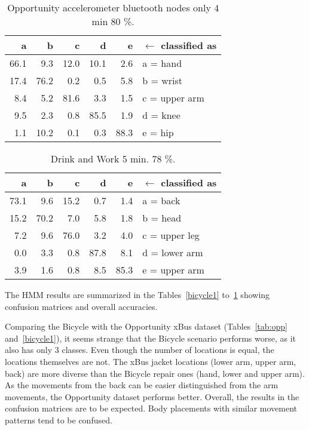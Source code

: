 \begin{table}[!t]
\centering
\caption[Opportunity accelerometer bluetooth nodes]{Opportunity accelerometer bluetooth nodes only 4 min 80 \%.}
\begin{tabular}{|r r r r r ||l|}\midrule
a &b &c &d &e &$\gets$ classified as\\\midrule
66.1 &9.3 &12.0 &10.1 &2.6 &a = hand\\
17.4 &76.2 &0.2 &0.5 &5.8 &b = wrist\\
8.4 &5.2 &81.6 &3.3 &1.5 &c = upper arm\\
9.5 &2.3 &0.8 &85.5 &1.9 &d = knee\\
1.1 &10.2 &0.1 &0.3 &88.3 &e = hip\\
\bottomrule
\end{tabular}
\end{table}


\begin{table}[!t]
\centering
\caption{Drink and Work 5 min. 78 \%.}
\begin{tabular}{|r r r r r l|}\midrule
a &b &c &d &e &$\gets$ classified as\\\midrule
73.1 &9.6 &15.2 &0.7 &1.4 &a = back\\
15.2 &70.2 &7.0 &5.8 &1.8 &b = head\\
7.2 &9.6 &76.0 &3.2 &4.0 &c = upper leg\\
0.0 &3.3 &0.8 &87.8 &8.1 &d = lower arm\\
3.9 &1.6 &0.8 &8.5 &85.3 &e = upper arm\\
\bottomrule
\end{tabular}
\label{drink}
\end{table}


The HMM results are summarized in the Tables~\ref{bicycle1}
to~\ref{drink} showing confusion matrices and overall accuracies.  


Comparing the Bicycle with the Opportunity xBus dataset (Tables~\ref{tab:opp} and~\ref{bicycle1}), 
it seems strange that the Bicycle scenario performs worse, as it also has only
3 classes. Even though the number of locations is equal, the locations
themselves are not. The xBus jacket locations (lower arm, upper arm,
back) are more diverse than the Bicycle repair ones (hand, lower and
upper arm). As the movements from the back can be easier distinguished
from the arm movements, the Opportunity dataset performs better.
Overall, the results in the confusion matrices are to be expected.
Body placements with similar movement patterns tend to be confused.

